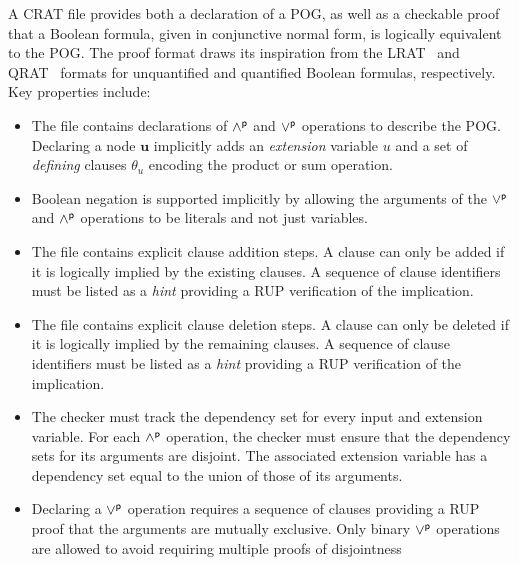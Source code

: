 \documentclass[letterpaper,USenglish,cleveref, autoref, thm-restate]{lipics-v2021}
\newcommand{\pand}{\mathbin{\land^{\sf p}}}
\newcommand{\por}{\mathbin{\lor^{\sf p}}}
\newcommand{\makenode}[1]{\mathbf{#1}}
\newcommand{\nodeu}{\makenode{u}}
\begin{document}

A CRAT file provides both a declaration of a POG, as well as a checkable
proof that a Boolean formula, given in conjunctive normal
form, is logically equivalent to the POG\@.
The proof format draws its inspiration from the LRAT~\cite{lrat} and
QRAT~\cite{heule:JAR2014} formats for unquantified and quantified Boolean formulas, respectively.
Key properties include:
\begin{itemize}
  \item
  The file contains declarations of $\pand$ and $\por$ operations to describe the POG.
  Declaring a node $\nodeu$
implicitly adds an {\em extension} variable $u$ and a set of {\em defining} clauses $\theta_{u}$
  encoding the product or sum operation.
\item Boolean negation is supported implicitly by allowing the
  arguments of the $\por$ and $\pand$ operations to be literals and not just
  variables.
\item
  The file contains explicit clause addition steps.
  A clause can only be added if it is logically implied by the existing clauses.
  A sequence of clause identifiers must be listed as a {\em hint} providing a RUP verification of the implication.
\item
  The file contains explicit clause deletion steps.
  A clause can only be deleted if it is logically implied by the remaining clauses.
  A sequence of clause identifiers must be listed as a {\em hint} providing a RUP verification of the implication.
\item The checker must track the dependency set for every input and
  extension variable.  For each $\pand$ operation, the checker must ensure that the dependency sets for its arguments are disjoint.
  The associated extension variable has a dependency set equal to the union of those of its arguments.
\item Declaring a $\por$ operation requires a sequence of clauses
  providing a RUP proof that the arguments are mutually exclusive.
  Only binary $\por$ operations are allowed to avoid requiring multiple proofs of disjointness
\end{itemize}
\end{document}
